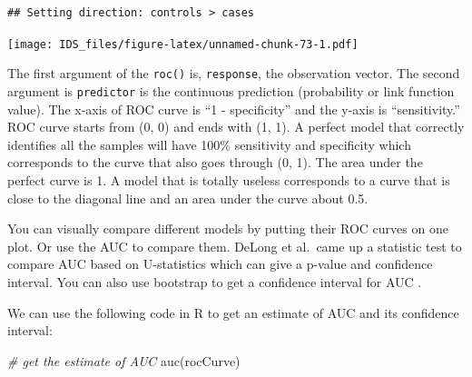 \documentclass[
  12pt,
]{krantz}
\makeatletter
\newenvironment{Shaded}{\begin{snugshade}}{\end{snugshade}}
\newcommand{\AttributeTok}[1]{\textcolor[rgb]{0.61,0.61,0.61}{#1}}
\newcommand{\CommentTok}[1]{\textcolor[rgb]{0.37,0.37,0.37}{\textit{#1}}}
\newcommand{\DecValTok}[1]{\textcolor[rgb]{0.06,0.06,0.06}{#1}}
\newcommand{\FunctionTok}[1]{\textcolor[rgb]{0,0,0}{#1}}
\newcommand{\NormalTok}[1]{#1}
\newcommand{\SpecialCharTok}[1]{\textcolor[rgb]{0,0,0}{#1}}
\newcommand{\StringTok}[1]{\textcolor[rgb]{0.5,0.5,0.5}{#1}}
\newenvironment{kframe}{%
\medskip{}
\setlength{\fboxsep}{.8em}
 \def\at@end@of@kframe{}%
 \ifinner\ifhmode%
  \def\at@end@of@kframe{\end{minipage}}%
  \begin{minipage}{\columnwidth}%
 \fi\fi%
 \def\FrameCommand##1{\hskip\@totalleftmargin \hskip-\fboxsep
 \colorbox{shadecolor}{##1}\hskip-\fboxsep
     \hskip-\linewidth \hskip-\@totalleftmargin \hskip\columnwidth}%
 \MakeFramed {\advance\hsize-\width
   \@totalleftmargin\z@ \linewidth\hsize
   \@setminipage}}%
 {\par\unskip\endMakeFramed%
 \at@end@of@kframe}
\renewenvironment{Shaded}{\begin{kframe}}{\end{kframe}}
\makeatother
\begin{document}
\begin{verbatim}
## Setting direction: controls > cases
\end{verbatim}

\begin{Shaded}
\end{Shaded}

\texttt{[image: IDS\_files/figure-latex/unnamed-chunk-73-1.pdf]}

The first argument of the \texttt{roc()} is, \texttt{response}, the observation vector. The second argument is \texttt{predictor} is the continuous prediction (probability or link function value). The x-axis of ROC curve is ``1 - specificity'' and the y-axis is ``sensitivity.'' ROC curve starts from (0, 0) and ends with (1, 1). A perfect model that correctly identifies all the samples will have 100\% sensitivity and specificity which corresponds to the curve that also goes through (0, 1). The area under the perfect curve is 1. A model that is totally useless corresponds to a curve that is close to the diagonal line and an area under the curve about 0.5.

You can visually compare different models by putting their ROC curves on one plot. Or use the AUC to compare them. DeLong et al.~came up a statistic test to compare AUC based on U-statistics \citep{delong1988} which can give a p-value and confidence interval. You can also use bootstrap to get a confidence interval for AUC \citep{hall2004}.

We can use the following code in R to get an estimate of AUC and its confidence interval:

\begin{Shaded}
\begin{Highlighting}[]
\CommentTok{\# get the estimate of AUC}
\FunctionTok{auc}\NormalTok{(rocCurve)}
\end{Highlighting}
\end{Shaded}
\end{document}
